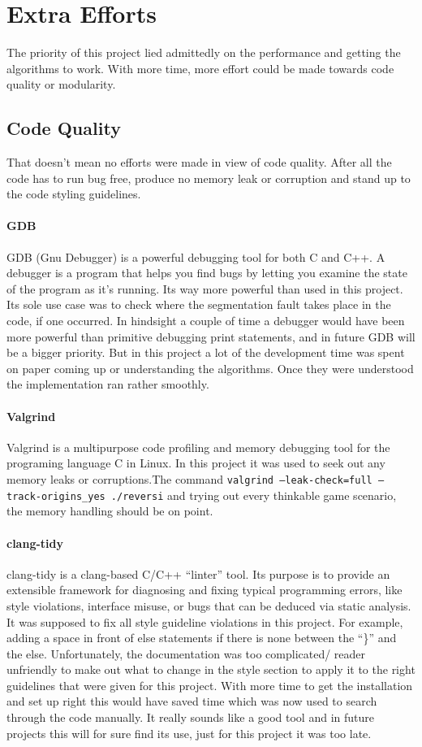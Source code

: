 
\chapter{Extra Efforts}\label{chapter:efforts}
The priority of this project lied admittedly on the performance and getting the algorithms to work. With more time, more effort could be made towards code quality or modularity.
\section{Code Quality}
That doesn’t mean no efforts were made in view of code quality. After all the code has to run bug free, produce no memory leak or corruption and stand up to the code styling guidelines.
\subsubsection{GDB}
GDB (Gnu Debugger) is a powerful debugging tool for both C and C++. A debugger is a program that helps you find bugs by letting you examine the state of the program as it's running. Its way more powerful than used in this project. Its sole use case was to check where the segmentation fault takes place in the code, if one occurred. In hindsight a couple of time a debugger would have been more powerful than primitive debugging print statements, and in future GDB will be a bigger priority. But in this project a lot of the development time was spent on paper coming up or understanding the algorithms. Once they were understood the implementation ran rather smoothly.  
\subsubsection{Valgrind}
Valgrind is a multipurpose code profiling and memory debugging tool for the programing language C in Linux. In this project it was used to seek out any memory leaks or corruptions.\newline The command \verb|valgrind –leak-check=full –track-origins_yes ./reversi| and trying out every thinkable game scenario, the memory handling should be on point.
\subsubsection{clang-tidy}
clang-tidy is a clang-based C/C++ “linter” tool. Its purpose is to provide an extensible framework for diagnosing and fixing typical programming errors, like style violations, interface misuse, or bugs that can be deduced via static analysis. It was supposed to fix all style guideline violations in this project. For example, adding a space in front of else statements if there is none between the “\}” and the else. Unfortunately, the documentation was too complicated/ reader unfriendly to make out what to change in the style section to apply it to the right guidelines that were given for this project. With more time to get the installation and set up right this would have saved time which was now used to search through the code manually. It really sounds like a good tool and in future projects this will for sure find its use, just for this project it was too late.
